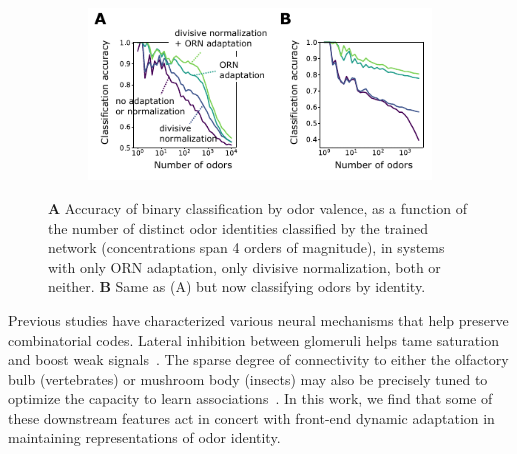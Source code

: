 \documentclass[10pt,prl,aps,showpacs,twocolumn,unsortedaddress]{revtex4-1}
\begin{document}
\begin{figure}[!t]
	\centering
	\begin{subfigure}[t]{\linewidth}
		\includegraphics[width=\textwidth]{figures/5_downstream}
		\label{fig:downstream_a}	
	\end{subfigure}
	\begin{subfigure}[t]{0\linewidth}
		\label{fig:downstream_b}
	\end{subfigure}
	\caption{\footnotesize{
	\textbf{A} Accuracy of binary classification by odor valence, as a function of the number of distinct odor identities classified by the trained network (concentrations span 4 orders of magnitude), in systems with only ORN adaptation, only divisive normalization, both or neither. \textbf{B} Same as (A) but now classifying odors  by identity.
	}}
	\label{fig:downstream}
\end{figure}


Previous studies have characterized various neural mechanisms that help preserve combinatorial codes. 
Lateral inhibition between glomeruli helps tame saturation and boost weak signals~\cite{divisive_normalization}. %
The sparse degree of connectivity to either the olfactory bulb (vertebrates) or mushroom body (insects) %
may also be precisely tuned to optimize the capacity to learn associations~\cite{litwinkumar}. In this work, we find that some of these downstream features act in concert with front-end dynamic adaptation in maintaining representations of odor identity.
\end{document}
